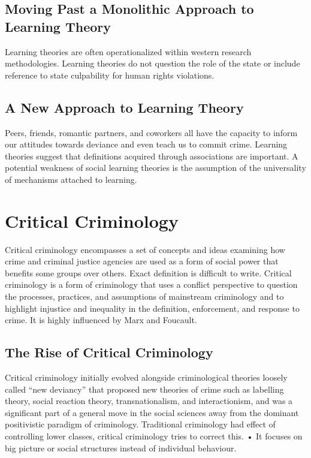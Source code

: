 \documentclass{article}
\begin{document}
\subsection{Moving Past a Monolithic Approach to Learning Theory}

Learning theories are often operationalized within western research methodologies. Learning theories do not question the role of the state or include reference to state culpability for human rights violations.

\subsection{A New Approach to Learning Theory}

Peers, friends, romantic partners, and coworkers all have the capacity to inform our attitudes towards deviance and even teach us to commit crime. Learning theories suggest that definitions acquired through associations are important. A potential weakness of social learning theories is the assumption of the universality of mechanisms attached to learning. 

\section{Critical Criminology}

Critical criminology encompasses a set of concepts and ideas examining how crime and criminal justice agencies are used as a form of social power that benefits some groups over others. Exact definition is difficult to write. Critical criminology is a form of criminology that uses a conflict perspective to question the processes, practices, and assumptions of mainstream criminology and to highlight injustice and inequality in the definition, enforcement, and response to crime. It is highly influenced by Marx and Foucault.

\subsection{The Rise of Critical Criminology}

Critical criminology initially evolved alongside criminological theories loosely called “new deviancy” that proposed new theories of crime such as labelling theory, social reaction theory, transnationalism, and interactionism, and was a significant part of a general move in the social sciences away from the dominant positivistic paradigm of criminology. Traditional criminology had effect of controlling lower classes, critical criminology tries to correct this. 	• It focuses on big picture or social structures instead of individual behaviour.
\end{document}
